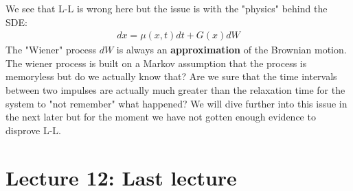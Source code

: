 \documentclass{report}
\begin{document}
We see that L-L is wrong here but the issue is with the "physics" behind the SDE:
\begin{align}
    d x=\mu\left(x, t\right) d t+G(x) d W
\end{align}
The "Wiener" process $dW$ is always an \textbf{approximation} of the Brownian motion. The wiener process is built on a Markov assumption that the process is memoryless but do we actually know that? Are we sure that the time intervals between two impulses are actually much greater than the relaxation time for the system to "not remember" what happened? We will dive further into this issue in the next later but for the moment we have not gotten enough evidence to disprove L-L.

\chapter{Lecture 12: Last lecture}
\end{document}

